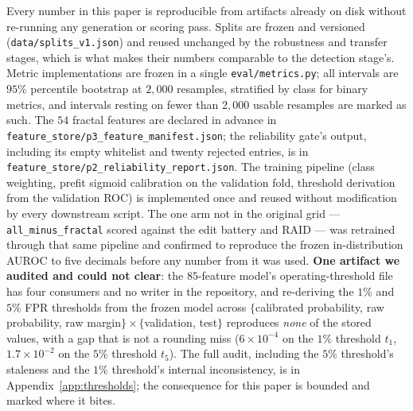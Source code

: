 \documentclass{article}
\newcommand{\arm}[1]{\texttt{#1}}
\begin{document}
Every number in this paper is reproducible from artifacts already on disk
without re-running any generation or scoring pass. Splits are frozen and
versioned (\texttt{data/splits\_v1.json}) and reused unchanged by the robustness
and transfer stages, which is what makes their numbers comparable to the
detection stage's. Metric implementations are frozen in a single
\texttt{eval/metrics.py}; all intervals are $95\%$ percentile bootstrap at
$2{,}000$ resamples, stratified by class for binary metrics, and intervals
resting on fewer than $2{,}000$ usable resamples are marked as such. The $54$
fractal features are declared in advance in
\texttt{feature\_store/p3\_feature\_manifest.json}; the reliability gate's
output, including its empty whitelist and twenty rejected entries, is in
\texttt{feature\_store/p2\_reliability\_report.json}. The training pipeline
(class weighting, prefit sigmoid calibration on the validation fold, threshold
derivation from the validation ROC) is implemented once and reused without
modification by every downstream script. The one arm not in the original grid ---
\arm{all\_minus\_fractal} scored against the edit battery and RAID --- was
retrained through that same pipeline and confirmed to reproduce the frozen
in-distribution AUROC to five decimals before any number from it was used.
\textbf{One artifact we audited and could not clear}: the $85$-feature model's
operating-threshold file has four consumers and no writer in the repository, and
re-deriving the $1\%$ and $5\%$ FPR thresholds from the frozen model across
$\{$calibrated probability, raw probability, raw margin$\}\times\{$validation,
test$\}$ reproduces \emph{none} of the stored values, with a gap that is not a
rounding miss ($6\!\times\!10^{-4}$ on the $1\%$ threshold $t_{1}$,
$1.7\!\times\!10^{-2}$ on the $5\%$ threshold $t_{5}$). The full audit, including the $5\%$ threshold's staleness and the $1\%$
threshold's internal inconsistency, is in Appendix~\ref{app:thresholds}; the
consequence for this paper is bounded and marked where it bites.




\appendix
\end{document}
